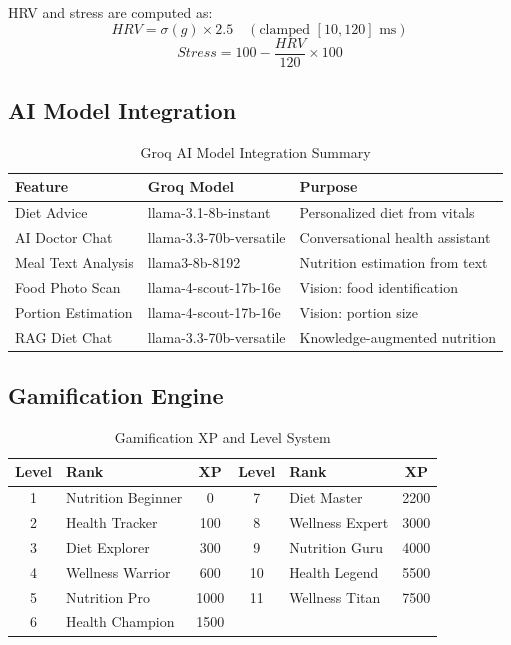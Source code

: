\documentclass[12pt,a4paper]{report}
\begin{document}
HRV and stress are computed as:
\begin{equation}
HRV = \sigma(g) \times 2.5 \quad (\text{clamped } [10, 120] \text{ ms})
\end{equation}
\begin{equation}
Stress = 100 - \frac{HRV}{120} \times 100
\end{equation}

\subsection{AI Model Integration}

\begin{table}[H]
\centering
\caption{Groq AI Model Integration Summary}
\label{tab:aimodels}
\begin{tabular}{|l|l|l|}
\hline
\textbf{Feature} & \textbf{Groq Model} & \textbf{Purpose} \\
\hline
Diet Advice & llama-3.1-8b-instant & Personalized diet from vitals \\
AI Doctor Chat & llama-3.3-70b-versatile & Conversational health assistant \\
Meal Text Analysis & llama3-8b-8192 & Nutrition estimation from text \\
Food Photo Scan & llama-4-scout-17b-16e & Vision: food identification \\
Portion Estimation & llama-4-scout-17b-16e & Vision: portion size \\
RAG Diet Chat & llama-3.3-70b-versatile & Knowledge-augmented nutrition \\
\hline
\end{tabular}
\end{table}

\subsection{Gamification Engine}

\begin{table}[H]
\centering
\caption{Gamification XP and Level System}
\label{tab:gamification}
\begin{tabular}{|c|l|c||c|l|c|}
\hline
\textbf{Level} & \textbf{Rank} & \textbf{XP} & \textbf{Level} & \textbf{Rank} & \textbf{XP} \\
\hline
1 & Nutrition Beginner & 0 & 7 & Diet Master & 2200 \\
2 & Health Tracker & 100 & 8 & Wellness Expert & 3000 \\
3 & Diet Explorer & 300 & 9 & Nutrition Guru & 4000 \\
4 & Wellness Warrior & 600 & 10 & Health Legend & 5500 \\
5 & Nutrition Pro & 1000 & 11 & Wellness Titan & 7500 \\
6 & Health Champion & 1500 & & & \\
\hline
\end{tabular}
\end{table}
\end{document}

